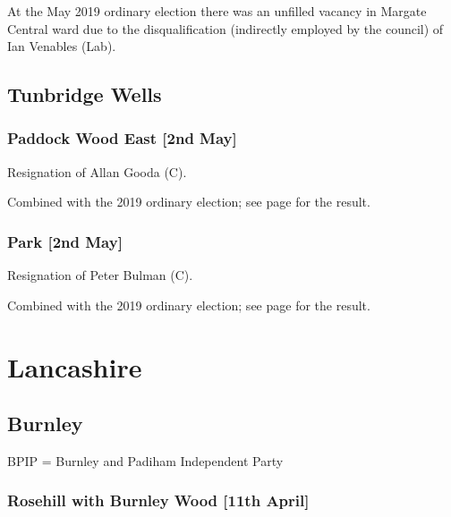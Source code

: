 \documentclass[a4paper,openany]{book}
\begin{document}
\begin{resultsiii}
At the May 2019 ordinary election there was an unfilled vacancy in Margate Central ward due to the disqualification (indirectly employed by the council) of Ian Venables (Lab).

\subsection*{Tunbridge Wells}

\subsubsection*{Paddock Wood East \hspace*{\fill}\nolinebreak[1]%
	\enspace\hspace*{\fill}
	[2nd May]}


Resignation of Allan Gooda (C).

Combined with the 2019 ordinary election; see page \pageref{TunbridgeWellsPaddockWoodEast} for the result.

\subsubsection*{Park \hspace*{\fill}\nolinebreak[1]%
	\enspace\hspace*{\fill}
	[2nd May]}


Resignation of Peter Bulman (C).

Combined with the 2019 ordinary election; see page \pageref{TunbridgeWellsPark} for the result.

\section{Lancashire}

\subsection*{Burnley}

BPIP = Burnley and Padiham Independent Party

\subsubsection*{Rosehill with Burnley Wood \hspace*{\fill}\nolinebreak[1]%
	\enspace\hspace*{\fill}
	[11th April]}


\end{resultsiii}
\end{document}
